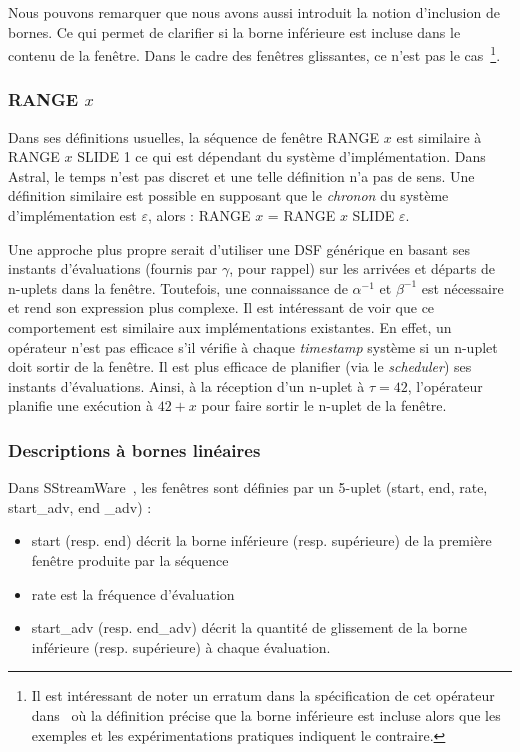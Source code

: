 Nous pouvons remarquer que nous avons aussi introduit la notion d'inclusion de bornes. Ce qui permet de clarifier si la borne inférieure est incluse dans le contenu de la fenêtre. Dans le cadre des fenêtres glissantes, ce n'est pas le cas~\footnote{Il est intéressant de noter un erratum dans la spécification de cet opérateur dans~\cite{Jain:spread} où la définition précise que la borne inférieure est incluse alors que les exemples et les expérimentations pratiques indiquent le contraire.}.

\subsubsection{RANGE $x$}
Dans ses définitions usuelles, la séquence de fenêtre RANGE $x$ est similaire à RANGE $x$ SLIDE 1 ce qui est dépendant du système d'implémentation. Dans Astral, le temps n'est pas discret et une telle définition n'a pas de sens. Une définition similaire est possible en supposant que le \textit{chronon} du système d'implémentation est $\varepsilon$, alors : RANGE $x$ = RANGE $x$ SLIDE $\varepsilon$.

Une approche plus propre serait d'utiliser une DSF générique en basant ses instants d'évaluations (fournis par $\gamma$, pour rappel) sur les arrivées et départs de n-uplets dans la fenêtre. Toutefois, une connaissance de $\alpha^{-1}$ et $\beta^{-1}$ est nécessaire et rend son expression plus complexe. Il est intéressant de voir que ce comportement est similaire aux implémentations existantes. En effet, un opérateur n'est pas efficace s'il vérifie à chaque \textit{timestamp} système si un n-uplet doit sortir de la fenêtre. Il est plus efficace de planifier (via le \textit{scheduler}) ses instants d'évaluations. Ainsi, à la réception d'un n-uplet à $\tau=42$, l'opérateur planifie une exécution à $42+x$ pour faire sortir le n-uplet de la fenêtre.

\subsubsection{Descriptions à bornes linéaires}
Dans SStreamWare~\cite{Gurgen:sstreamware}, les fenêtres sont définies par un 5-uplet (start, end, rate, start\_adv, end \_adv) :
\begin{itemize}
	\item start (resp. end) décrit la borne inférieure (resp. supérieure) de la première fenêtre produite par la séquence
	\item rate est la fréquence d'évaluation
	\item start\_adv (resp. end\_adv) décrit la quantité de glissement de la borne inférieure (resp. supérieure) à chaque évaluation.
\end{itemize}


